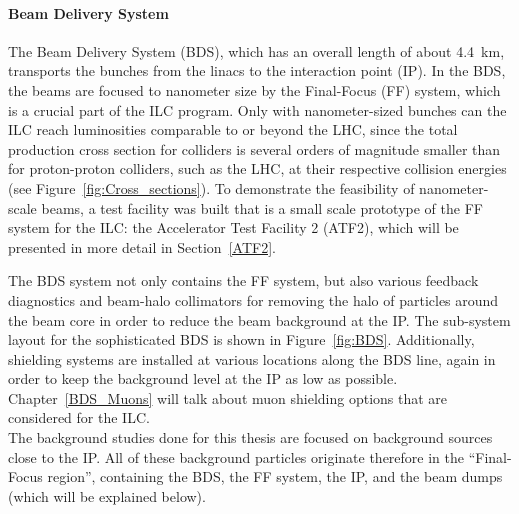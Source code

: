 \paragraph{Beam Delivery System}
The Beam Delivery System (BDS), which has an overall length of about \SI{4.4}{\kilo\meter}, transports the bunches from the linacs to the interaction point (IP).
In the BDS, the beams are focused to nanometer size by the Final-Focus (FF) system, which is a crucial part of the ILC program.
Only with nanometer-sized bunches can the ILC reach luminosities comparable to or beyond the LHC, since the total production cross section for \positron \electron colliders is several orders of magnitude smaller than for proton-proton colliders, such as the LHC, at their respective collision energies (see Figure~\ref{fig:Cross_sections}).
To demonstrate the feasibility of nanometer-scale beams, a test facility was built that is a small scale prototype of the FF system for the ILC: the Accelerator Test Facility 2 (ATF2), which will be presented in more detail in Section~\ref{ATF2}.

The BDS system not only contains the FF system, but also various feedback diagnostics and beam-halo collimators for removing the halo of particles around the beam core in order to reduce the beam background at the IP. 
The sub-system layout for the sophisticated BDS is shown in Figure~\ref{fig:BDS}.
Additionally, shielding systems are installed at various locations along the BDS line, again in order to keep the background level at the IP as low as possible.
Chapter~\ref{BDS_Muons} will talk about muon shielding options that are considered for the ILC.
\\The background studies done for this thesis are focused on background sources close to the IP.
All of these background particles originate therefore in the ``Final-Focus region'', containing the BDS, the FF system, the IP, and the beam dumps (which will be explained below).

